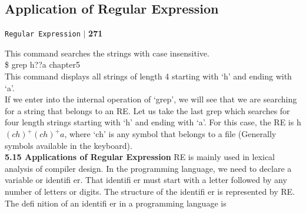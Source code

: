 \documentclass[8pt]{beamer}
\begin{document}
\begin{frame}
\section*{Application of Regular Expression}
\begin{flushright}
 \texttt{Regular Expression} \hspace*{0.1cm}\textbf{$|$} \hspace*{0.1cm} \textbf{271}\hspace*{0.1cm}
\end{flushright}

\vspace*{0.5cm}
\hspace*{0.5cm} This command searches the strings with case insensitive.\\

\hspace*{4cm}  \$ grep h??a chapter5\\

\hspace*{0.5cm} This command displays all strings of length 4 starting with ‘h’ and ending with ‘a’.\\
\hspace*{0.5cm} If we enter into the internal operation of ‘grep’, we will see that we are searching for a string that
belongs to an RE. Let us take the last grep which searches for four length strings starting with ‘h’ and
ending with ‘a’. For this case, the RE is h$(ch)^+(ch)^+a$, where ‘ch’ is any symbol that belongs to a file
(Generally symbols available in the keyboard).\\

\vspace*{0.3cm}
\large{
\textbf{5.15 Applications of Regular Expression}
}
\small{
RE is mainly used in lexical analysis of compiler design. In the programming language, we need to
declare a variable or identifi er. That identifi er must start with a letter followed by any number of letters
or digits. The structure of the identifi er is represented by RE. The defi nition of an identifi er in a
programming language is\\
}
\end{frame}
\end{document}
